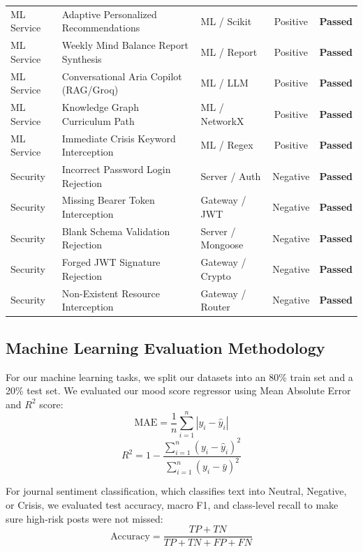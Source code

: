 \begin{table}[H]
\begin{tabular}{lp{6.2cm}lcc}
ML Service & Adaptive Personalized Recommendations & ML / Scikit & Positive & \textbf{Passed} \\
ML Service & Weekly Mind Balance Report Synthesis & ML / Report & Positive & \textbf{Passed} \\
ML Service & Conversational Aria Copilot (RAG/Groq) & ML / LLM & Positive & \textbf{Passed} \\
ML Service & Knowledge Graph Curriculum Path & ML / NetworkX & Positive & \textbf{Passed} \\
ML Service & Immediate Crisis Keyword Interception & ML / Regex & Positive & \textbf{Passed} \\
\midrule
Security & Incorrect Password Login Rejection & Server / Auth & Negative & \textbf{Passed} \\
Security & Missing Bearer Token Interception & Gateway / JWT & Negative & \textbf{Passed} \\
Security & Blank Schema Validation Rejection & Server / Mongoose & Negative & \textbf{Passed} \\
Security & Forged JWT Signature Rejection & Gateway / Crypto & Negative & \textbf{Passed} \\
Security & Non-Existent Resource Interception & Gateway / Router & Negative & \textbf{Passed} \\
\bottomrule
\end{tabular}
\end{table}

\subsection{Machine Learning Evaluation Methodology}
For our machine learning tasks, we split our datasets into an 80\% train set and a 20\% test set. We evaluated our mood score regressor using Mean Absolute Error and $R^2$ score:
\begin{equation}
    \text{MAE} = \frac{1}{n} \sum_{i=1}^{n} |y_i - \hat{y}_i|
\end{equation}
\begin{equation}
    R^2 = 1 - \frac{\sum_{i=1}^{n} (y_i - \hat{y}_i)^2}{\sum_{i=1}^{n} (y_i - \bar{y})^2}
\end{equation}

For journal sentiment classification, which classifies text into Neutral, Negative, or Crisis, we evaluated test accuracy, macro F1, and class-level recall to make sure high-risk posts were not missed:
\begin{equation}
    \text{Accuracy} = \frac{TP + TN}{TP + TN + FP + FN}
\end{equation}

